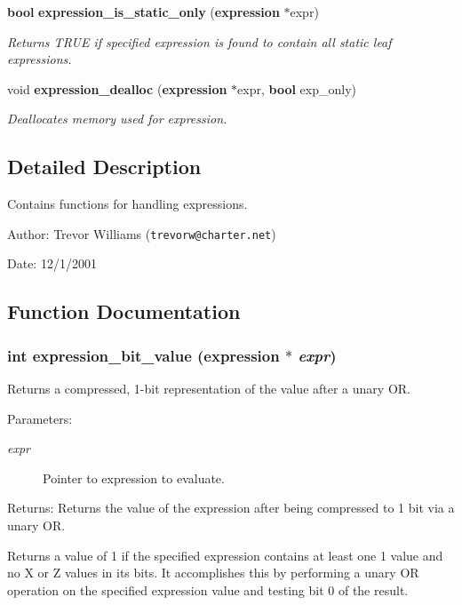 \begin{CompactItemize}
{\bf bool} {\bf expression\_\-is\_\-static\_\-only} ({\bf expression} $\ast$expr)
\begin{CompactList}\small\item\em Returns TRUE if specified expression is found to contain all static leaf expressions. \item\end{CompactList}\item 
void {\bf expression\_\-dealloc} ({\bf expression} $\ast$expr, {\bf bool} exp\_\-only)
\begin{CompactList}\small\item\em Deallocates memory used for expression. \item\end{CompactList}\end{CompactItemize}


\subsection{Detailed Description}
Contains functions for handling expressions. 

\begin{Desc}
\item[Author:]Trevor Williams ({\tt trevorw@charter.net}) \end{Desc}
\begin{Desc}
\item[Date:]12/1/2001 \end{Desc}


\subsection{Function Documentation}
\subsubsection{\setlength{\rightskip}{0pt plus 5cm}int expression\_\-bit\_\-value ({\bf expression} $\ast$ {\em expr})}\label{expr_8h_a11}


Returns a compressed, 1-bit representation of the value after a unary OR. 

\begin{Desc}
\item[Parameters:]
\begin{description}
\item[{\em expr}]Pointer to expression to evaluate.\end{description}
\end{Desc}
\begin{Desc}
\item[Returns:]Returns the value of the expression after being compressed to 1 bit via a unary OR.\end{Desc}
Returns a value of 1 if the specified expression contains at least one 1 value and no X or Z values in its bits. It accomplishes this by performing a unary OR operation on the specified expression value and testing bit 0 of the result. 
